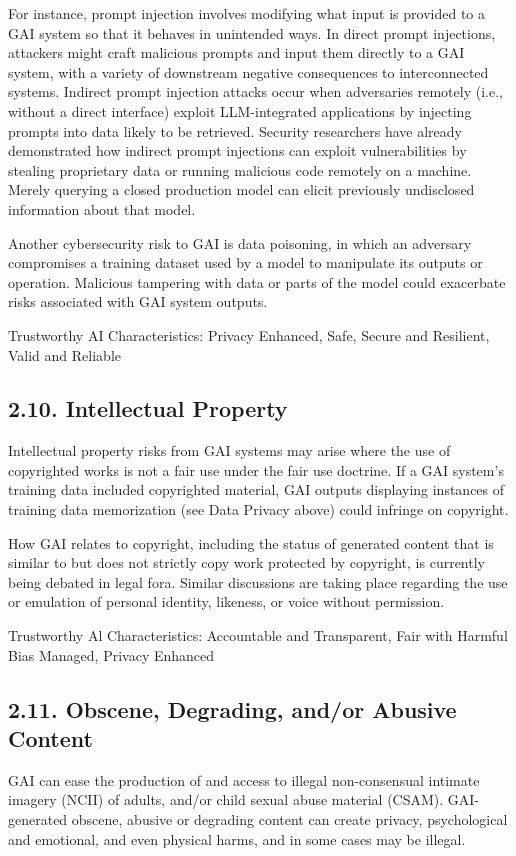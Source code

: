\documentclass[10pt]{article}
\begin{document}
For instance, prompt injection involves modifying what input is provided to a GAI system so that it behaves in unintended ways. In direct prompt injections, attackers might craft malicious prompts and input them directly to a GAI system, with a variety of downstream negative consequences to interconnected systems. Indirect prompt injection attacks occur when adversaries remotely (i.e., without a direct interface) exploit LLM-integrated applications by injecting prompts into data likely to be retrieved. Security researchers have already demonstrated how indirect prompt injections can exploit vulnerabilities by stealing proprietary data or running malicious code remotely on a machine. Merely querying a closed production model can elicit previously undisclosed information about that model.

Another cybersecurity risk to GAI is data poisoning, in which an adversary compromises a training dataset used by a model to manipulate its outputs or operation. Malicious tampering with data or parts of the model could exacerbate risks associated with GAI system outputs.

Trustworthy AI Characteristics: Privacy Enhanced, Safe, Secure and Resilient, Valid and Reliable
\subsection*{2.10. Intellectual Property}
Intellectual property risks from GAI systems may arise where the use of copyrighted works is not a fair use under the fair use doctrine. If a GAI system's training data included copyrighted material, GAI outputs displaying instances of training data memorization (see Data Privacy above) could infringe on copyright.

How GAI relates to copyright, including the status of generated content that is similar to but does not strictly copy work protected by copyright, is currently being debated in legal fora. Similar discussions are taking place regarding the use or emulation of personal identity, likeness, or voice without permission.

Trustworthy Al Characteristics: Accountable and Transparent, Fair with Harmful Bias Managed, Privacy Enhanced
\subsection*{2.11. Obscene, Degrading, and/or Abusive Content}
GAI can ease the production of and access to illegal non-consensual intimate imagery (NCII) of adults, and/or child sexual abuse material (CSAM). GAI-generated obscene, abusive or degrading content can create privacy, psychological and emotional, and even physical harms, and in some cases may be illegal.
\end{document}
